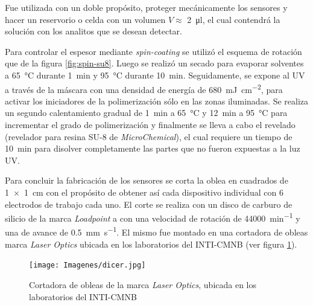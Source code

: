 		Fue utilizada con un doble propósito, proteger mecánicamente los sensores y hacer un reservorio o celda con un volumen  $V \approx$ \SI{2}{\ul}, el cual contendrá la solución con los analitos que se desean detectar.  
			
			
		Para controlar el espesor mediante \textit{spin-coating} se utilizó el esquema de rotación que de la figura \ref{fig:spin-su8}. Luego se realizó un secado para evaporar solventes a \SI{65}{\celsius} durante \SI{1}{\minute} y \SI{95}{\celsius} durante \SI{10}{\minute}. Seguidamente, se expone al UV a través de la máscara con una densidad de energía de \SI{680}{mJ.cm^{-2}}, para activar los iniciadores de la polimerización sólo en las zonas iluminadas. Se realiza un segundo calentamiento gradual de \SI{1}{\minute} a \SI{65}{\celsius} y \SI{12}{\minute} a \SI{95}{\celsius} para incrementar el grado de polimerización y finalmente se lleva a cabo el revelado (revelador para resina SU-8 de \textit{MicroChemical}), el cual requiere un tiempo de \SI{10}{\minute} para disolver completamente las partes que no fueron expuestas a la luz UV. 
		
		Para concluir la fabricación de los sensores se corta la oblea en cuadrados de \SI{1x1}{\cm} con el propósito de obtener así cada dispositivo individual con 6 electrodos de trabajo cada uno. El corte se realiza con un disco de carburo de silicio de la marca \textit{Loadpoint} a con una velocidad de rotación de \SI{44000}{\minute^{-1}} y una de avance de \SI{0.5}{\mm\per\second}. El mismo fue montado en una cortadora de obleas marca \textit{Laser Optics} ubicada en los laboratorios del INTI-CMNB (ver figura \ref{fig:dicer}).

			\begin{figure}[h!]
			 		  \begin{center}
			 		  \texttt{[image: Imagenes/dicer.jpg]}
			 		  \caption[Cortadora de obleas]{Cortadora de obleas de la marca \textit{Laser Optics}, ubicada en los laboratorios del INTI-CMNB}
			 		  \label{fig:dicer}
			 		  \end{center}
			 		  \end{figure}
		
